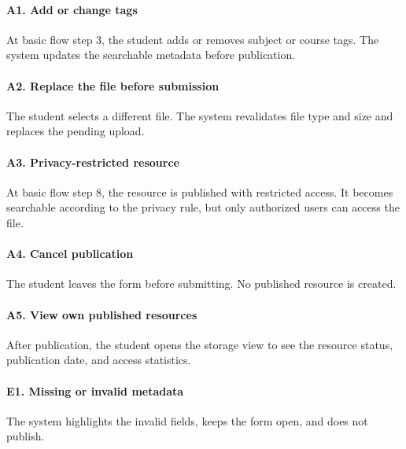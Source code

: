 \documentclass[12pt]{article}
\begin{document}
\paragraph*{A1. Add or change tags}
\par\medskip
At basic flow step 3, the student adds or removes subject or course tags. The system updates the searchable metadata before publication.
\par\medskip
\hypertarget{sec:a2-replace-the-file-before-submission}{}
\paragraph*{A2. Replace the file before submission}
\par\medskip
The student selects a different file. The system revalidates file type and size and replaces the pending upload.
\par\medskip
\hypertarget{sec:a3-privacy-restricted-resource}{}
\paragraph*{A3. Privacy-restricted resource}
\par\medskip
At basic flow step 8, the resource is published with restricted access. It becomes searchable according to the privacy rule, but only authorized users can access the file.
\par\medskip
\hypertarget{sec:a4-cancel-publication}{}
\paragraph*{A4. Cancel publication}
\par\medskip
The student leaves the form before submitting. No published resource is created.
\par\medskip
\hypertarget{sec:a5-view-own-published-resources}{}
\paragraph*{A5. View own published resources}
\par\medskip
After publication, the student opens the storage view to see the resource status, publication date, and access statistics.
\par\medskip
\hypertarget{sec:e1-missing-or-invalid-metadata}{}
\paragraph*{E1. Missing or invalid metadata}
\par\medskip
The system highlights the invalid fields, keeps the form open, and does not publish.
\par\medskip
\hypertarget{sec:e2-unsupported-file-type-or-oversized-file}{}
\end{document}
